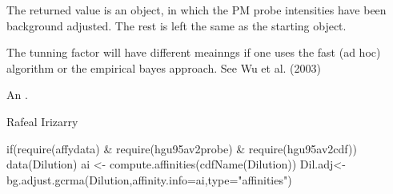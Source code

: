 \begin{Details}\relax
The returned value is an  object, in which the PM probe intensities
have been background adjusted. The rest is left the same as the
starting  object.

The tunning factor  will have different meainngs if one uses
the fast (ad hoc) algorithm or the empirical bayes approach. See Wu
et al. (2003)
\end{Details}
\begin{Value}
An .
\end{Value}
\begin{Author}\relax
Rafeal Irizarry
\end{Author}
\begin{Examples}
\begin{ExampleCode}
 if(require(affydata) & require(hgu95av2probe) & require(hgu95av2cdf)){
          data(Dilution)
          ai <- compute.affinities(cdfName(Dilution))
          Dil.adj<-bg.adjust.gcrma(Dilution,affinity.info=ai,type="affinities")
     }
\end{ExampleCode}
\end{Examples}

